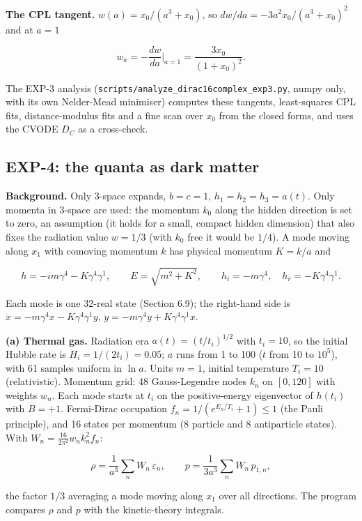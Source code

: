 \documentclass[11pt]{article}
\begin{document}
\textbf{The CPL tangent.} $w(a)=x_0/(a^3+x_0)$, so $dw/da=-3a^2x_0/(a^3+x_0)^2$ and at $a=1$

\[
w_a=-\frac{dw}{da}\Big|_{a=1}=\frac{3x_0}{(1+x_0)^2}.
\]

The EXP-3 analysis (\texttt{scripts/\allowbreak{}analyze\_\allowbreak{}dirac16c\allowbreak{}omplex\_e\allowbreak{}xp3.py}, numpy only, with its own Nelder-Mead minimiser) computes these tangents, least-squares CPL fits, distance-modulus fits and a fine scan over $x_0$ from the closed forms, and uses the CVODE $D_C$ as a cross-check.

\subsection{EXP-4: the quanta as dark matter}

\textbf{Background.} Only 3-space expands, $b=c=1$, $h_1=h_2=h_3=a(t)$. Only momenta in 3-space are used: the momentum $k_0$ along the hidden direction is set to zero, an assumption (it holds for a small, compact hidden dimension) that also fixes the radiation value $w=1/3$ (with $k_0$ free it would be $1/4$). A mode moving along $x_1$ with comoving momentum $k$ has physical momentum $K=k/a$ and

\[
h=-im\gamma^4-K\gamma^4\gamma^1,\qquad E=\sqrt{m^2+K^2},\qquad h_i=-m\gamma^4,\quad h_r=-K\gamma^4\gamma^1 .
\]

Each mode is one 32-real state (Section 6.9); the right-hand side is $\dot x=-m\gamma^4x-K\gamma^4\gamma^1y$, $\dot y=-m\gamma^4y+K\gamma^4\gamma^1x$.

\textbf{(a) Thermal gas.} Radiation era $a(t)=(t/t_i)^{1/2}$ with $t_i=10$, so the initial Hubble rate is $H_i=1/(2t_i)=0.05$; $a$ runs from 1 to 100 ($t$ from 10 to $10^5$), with 61 samples uniform in $\ln a$. Units $m=1$, initial temperature $T_i=10$ (relativistic). Momentum grid: 48 Gauss-Legendre nodes $k_n$ on $[0,120]$ with weights $w_n$. Each mode starts at $t_i$ on the positive-energy eigenvector of $h(t_i)$ with $B=+1$. Fermi-Dirac occupation $f_n=1/(e^{E_n/T_i}+1)\le1$ (the Pauli principle), and 16 states per momentum (8 particle and 8 antiparticle states). With $W_n=\frac{16}{2\pi^2}w_nk_n^2f_n$:

\[
\rho=\frac{1}{a^3}\sum_nW_n\,\varepsilon_n,\qquad p=\frac{1}{3a^3}\sum_nW_n\,p_{1,n},
\]

the factor $1/3$ averaging a mode moving along $x_1$ over all directions. The program compares $\rho$ and $p$ with the kinetic-theory integrals.
\end{document}

